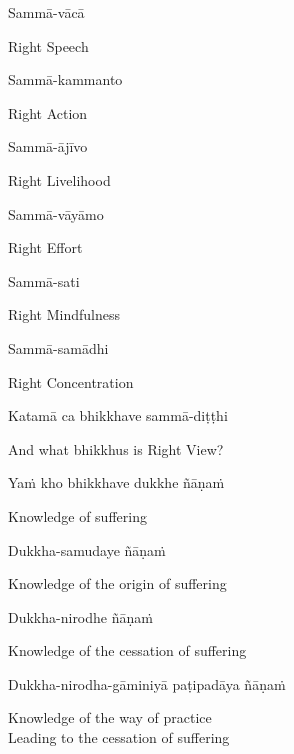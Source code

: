 Sammā-vācā

\begin{cprenglish}
Right Speech
\end{cprenglish}

Sammā-kammanto

\begin{cprenglish}
Right Action
\end{cprenglish}

Sammā-ājīvo

\begin{cprenglish}
Right Livelihood
\end{cprenglish}

Sammā-vāyāmo

\begin{cprenglish}
Right Effort
\end{cprenglish}

Sammā-sati

\begin{cprenglish}
Right Mindfulness
\end{cprenglish}

Sammā-samādhi

\begin{cprenglish}
Right Concentration
\end{cprenglish}

Katamā ca bhikkhave sammā-diṭṭhi

\begin{cprenglish}
And what bhikkhus is Right View?
\end{cprenglish}

Yaṁ kho bhikkhave dukkhe ñāṇaṁ

\begin{cprenglish}
Knowledge of suffering
\end{cprenglish}

Dukkha-samudaye ñāṇaṁ

\begin{cprenglish}
Knowledge of the origin of suffering
\end{cprenglish}

Dukkha-nirodhe ñāṇaṁ

\begin{cprenglish}
Knowledge of the cessation of suffering
\end{cprenglish}

Dukkha-nirodha-gāminiyā paṭipadāya ñāṇaṁ

\begin{cprenglish}
Knowledge of the way of practice\\
Leading to the cessation of suffering
\end{cprenglish}

